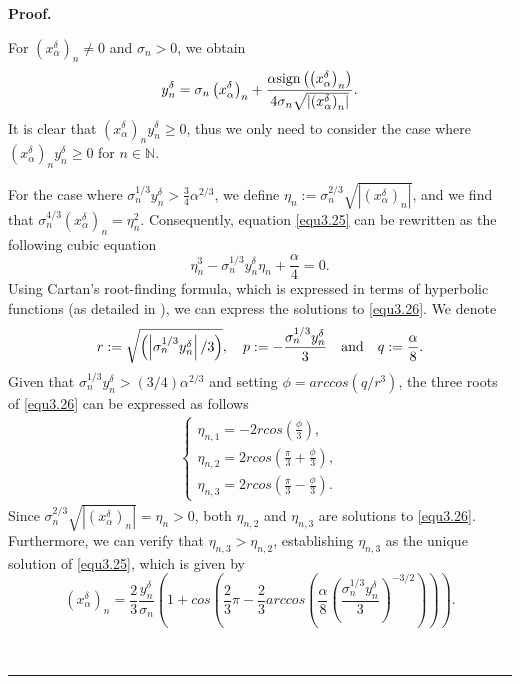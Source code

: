 \documentclass[a4paper,12pt]{article}
\numberwithin{equation}{section}
\newenvironment{proof}[1][Proof]{\textbf{#1.} }
{\ \rule{0.75em}{0.75em}\smallskip}
\begin{document}
\begin{proof}
    \par For $\left(x_{\alpha}^{\delta}\right)_{n}\neq 0$ and $\sigma_{n}>0$, we obtain 
    \begin{equation*}
        y^{\delta}_{n}=\sigma_{n} \left(x_{\alpha}^{\delta}\right)_{n}+ \frac{\alpha {\rm sign}\left(\left(x_{\alpha}^{\delta}\right)_{n}\right)} {4\sigma_{n}\sqrt{\left|\left(x_{\alpha}^{\delta}\right)_{n}\right|}}.
    \end{equation*} 
     It is clear that $\left(x_{\alpha}^{\delta}\right)_{n}y^{\delta}_{n}\geq 0$, thus we only need to consider the case where $\left(x_{\alpha}^{\delta}\right)_{n}y^{\delta}_{n}\geq 0$ for $n\in\mathbb{N}$.  
    \par For the case where $\sigma_{n}^{1/3}y^{\delta}_{n}> \frac{3}{4}\alpha^{2/3}$, we define $\eta_{n}:=\sigma_{n}^{2/3}\sqrt{|\left(x_{\alpha}^{\delta}\right)_{n}|}$, and we find that $\sigma_{n}^{4/3}\left(x_{\alpha}^{\delta}\right)_{n}=\eta_{n}^{2}$. Consequently, equation \eqref{equ3.25} can be rewritten as the following cubic equation
    \begin{equation}\label{equ3.26}
        \eta_{n}^{3}-\sigma_{n}^{1/3}y^{\delta}_{n}\eta_{n}+\frac{\alpha}{4}=0.
    \end{equation}
    Using Cartan's root-finding formula, which is expressed in terms of hyperbolic functions (as detailed in \cite{XCXZ12}), we can express the solutions to \eqref{equ3.26}. We denote  
    \begin{equation*}
        r:=\sqrt{\left(\left|\sigma_{n}^{1/3}y^{\delta}_{n}\right|/3\right)},\quad  p:=-\frac{\sigma_{n}^{1/3}y^{\delta}_{n}}{3}\quad {\rm and}\quad q:=\frac{\alpha}{8}.
    \end{equation*}
    Given that $\sigma_{n}^{1/3}y^{\delta}_{n}>(3/4)\alpha^{2/3}$ and setting $\phi=arccos(q/r^{3})$, the three roots of \eqref{equ3.26} can be expressed as follows
    \begin{align*}
        \left\{             
             \begin{array}{ll}
             \eta_{n,1}=-2rcos(\frac{\phi}{3}), \\
             \eta_{n,2}=2rcos(\frac{\pi}{3}+\frac{\phi}{3}), \\
             \eta_{n,3}=2rcos(\frac{\pi}{3}-\frac{\phi}{3}).
             \end{array}
        \right.
    \end{align*}
    Since $\sigma_{n}^{2/3}\sqrt{|\left(x_{\alpha}^{\delta}\right)_{n}|}=\eta_{n}>0$, both $\eta_{n,2}$ and $\eta_{n,3}$ are solutions to \eqref{equ3.26}. Furthermore, we can verify that $\eta_{n,3}>\eta_{n,2}$, establishing $\eta_{n,3}$ as the unique solution of \eqref{equ3.25}, which is given by
    \begin{equation*}
        \left(x_{\alpha}^{\delta}\right)_{n}=\frac{2}{3}\frac{y^{\delta}_{n}}{\sigma_{n}}\left(1+cos\left(\frac{2}{3}\pi-\frac{2}{3}arccos\left(\frac{\alpha}{8}\left(\frac{\sigma_{n}^{1/3}y^{\delta}_{n}}{3}\right)^{-3/2}\right)\right)\right).
    \end{equation*}
    

\end{proof}
\end{document}
